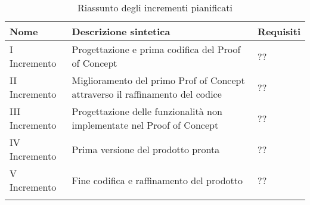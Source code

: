 \begin{center}
	\begin{longtable}{|p{2.5cm}|p{6.5cm}|p{6cm}|}
		\hline
		\rowcolor{lighter-grayer}
		\textbf{Nome}  & \textbf{Descrizione sintetica}                                                & \textbf{Requisiti} \\
		\hline
		\endfirsthead
		\hline
		\hline
		\endfoot
		\endlastfoot
		\hline
		I Incremento   & Progettazione e prima codifica del Proof of Concept                           & ??                 \\
		II Incremento  & Miglioramento del primo Prof of Concept attraverso il raffinamento del codice & ??                 \\
		III Incremento & Progettazione delle funzionalità non implementate nel Proof of Concept        & ??                 \\
		IV Incremento  & Prima versione del prodotto pronta                                            & ??                 \\
		V Incremento   & Fine codifica e raffinamento del prodotto                                     & ??                 \\ \hline
		\rowcolor{white}
		\caption{Riassunto degli incrementi pianificati}
	\end{longtable}
\end{center}